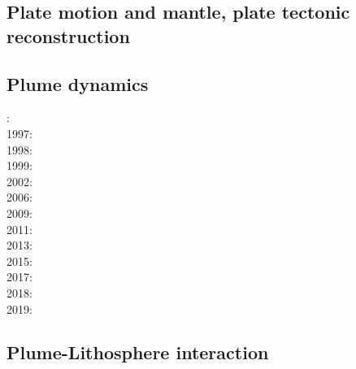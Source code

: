 \cite{scbg90}
\cite{kiha92}
\cite{somo96}
\cite{mazk98}\cite{moso98}
\cite{vavv05}
\cite{arta12}
\cite{gita14}
\cite{gery14b}
\cite{cram17}\cite{dast17}
\cite{king18}



\subsection*{Plate motion and mantle, plate tectonic reconstruction}

\noindent
\cite{mcse73}
\cite{zieg92a}
\cite{zhgm98}
\cite{evan03}\cite{reta03}
\cite{lizh09}\cite{vasv09}
\cite{huss12}\cite{gutz12}
\cite{mosq13}
\cite{yoha15}
\cite{tewg19}

\subsection*{Plume dynamics}

: \cite{nasf94}\cite{hayu94}\\
1997: \cite{vank97}\\
1998: \cite{thta98}\\
1999: \cite{lays99}\\
2002: \cite{falt02}\\
2006: \cite{isst06}\cite{liva06a}\cite{liva06b}\cite{zhon06}\cite{mita06}\\
2009: \cite{vavl09}\\
2011: \cite{toyu11}\cite{talz11}\cite{burk11}\cite{memm11}\cite{dalt11}\\
2013: \cite{dagm13}\cite{madd13}\cite{ande13}\\
2015: \cite{daso15}\cite{hafg15}\\
2017: \cite{zhli17}\\
2018: \cite{dacc18}\\
2019: \cite{argc19}

\subsection*{Plume-Lithosphere interaction}

